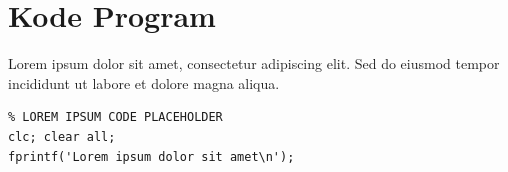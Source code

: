 \chapter{Kode Program}

Lorem ipsum dolor sit amet, consectetur adipiscing elit. Sed do eiusmod tempor incididunt ut labore et dolore magna aliqua.

\begin{verbatim}
% LOREM IPSUM CODE PLACEHOLDER
clc; clear all;
fprintf('Lorem ipsum dolor sit amet\n');
\end{verbatim}
